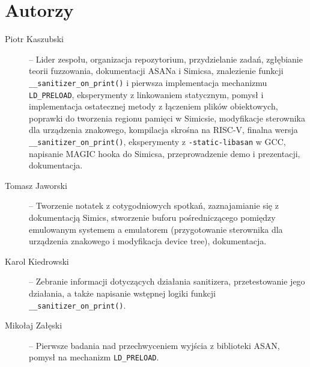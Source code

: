 \documentclass[../main.tex]{subfiles}
\begin{document}
\section{Autorzy}

\begin{description}
	\item [Piotr Kaszubski] --
		Lider zespołu, organizacja repozytorium, przydzielanie zadań,
		zgłębianie teorii fuzzowania, dokumentacji ASANa i Simicsa, znalezienie
		funkcji \texttt{__sanitizer_on_print()} i pierwsza implementacja
		mechanizmu \texttt{LD_PRELOAD}, eksperymenty z linkowaniem
		statycznym, pomysł i implementacja ostatecznej metody z łączeniem
		plików obiektowych, poprawki do tworzenia regionu pamięci w Simicsie,
		modyfikacje sterownika dla urządzenia znakowego, kompilacja skrośna na
		RISC-V, finalna wersja \texttt{__sanitizer_on_print()},
		eksperymenty z \texttt{-static-libasan} w GCC, napisanie MAGIC
		hooka do Simicsa, przeprowadzenie demo i prezentacji, dokumentacja.
	\item [Tomasz Jaworski] --
		Tworzenie notatek z cotygodniowych spotkań, zaznajamianie się z
		dokumentacją Simics, stworzenie buforu pośredniczącego pomiędzy
		emulowanym systemem a emulatorem (przygotowanie sterownika dla
		urządzenia znakowego i modyfikacja device tree), dokumentacja.
	\item [Karol Kiedrowski] --
		Zebranie informacji dotyczących działania sanitizera, przetestowanie
		jego działania, a także napisanie wstępnej logiki funkcji
		\texttt{__sanitizer_on_print()}.
	\item [Mikołaj Załęski] --
		Pierwsze badania nad przechwyceniem wyjścia z biblioteki ASAN, pomysł
		na mechanizm \texttt{LD_PRELOAD}.
\end{description}
\end{document}
